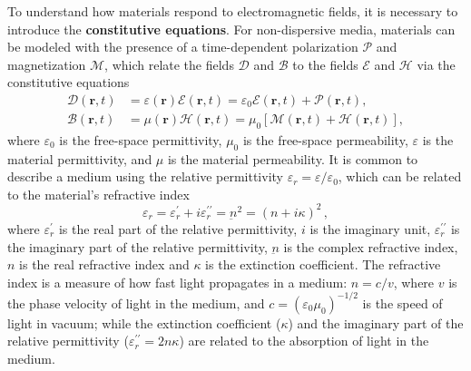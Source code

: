 To understand how materials respond to electromagnetic fields, it is necessary to introduce the \textbf{constitutive equations}.
 For non-dispersive media, materials can be
modeled
with the presence of a time-dependent polarization $\bm{\mathcal{P}}$ and
magnetization $\bm{\mathcal{M}}$,
which relate the fields $\bm{\mathcal{D}}$ and $\bm{\mathcal{B}}$ to the fields
$\bm{\mathcal{E}}$ and
$\bm{\mathcal{H}}$ via the constitutive equations~\cite{novotny}
\begin{align}
    \bm{\mathcal{D}}(\mathbf{r}, t) & = \varepsilon(\mathbf{r}) \bm{\mathcal{E}}(\mathbf{r}, t) =
    \varepsilon_0 \bm{\mathcal{E}}(\mathbf{r}, t) + \bm{\mathcal{P}}(\mathbf{r}, t),
    \label{eq:D}                                                                \\
    \bm{\mathcal{B}}(\mathbf{r}, t) & =  \mu(\mathbf{r}) \bm{\mathcal{H}}(\mathbf{r},
    t) = \mu_0 \left[ \bm{\mathcal{M}}(\mathbf{r},
    t) + \bm{\mathcal{H}}(\mathbf{r}, t)\right] \label{eq:H},
\end{align}
where $\varepsilon_0$ is the free-space permittivity, $\mu_0$ is the free-space
permeability, $\varepsilon$ is the material permittivity, and 
$\mu$ is the material permeability. It is common to describe a medium
using the relative permittivity $\varepsilon_r=\varepsilon/\varepsilon_0$, which can be related to the material's refractive index~\cite{wooten}
\begin{equation}\label{eq:perm}
    \varepsilon_r = \varepsilon_r^\prime +
i \varepsilon_r^{\prime\prime} = \underbar{n}^2 = (n+ i\kappa)^2\,,
\end{equation}
where $\varepsilon_r^\prime$ is the real part of the relative permittivity, $i$ is the imaginary unit, $\varepsilon_r^{\prime\prime}$ is the imaginary part of the relative permittivity, $\underbar{n}$ is the complex refractive index, 
$n$ is the real refractive index and $\kappa$ is the extinction coefficient. 
The refractive index is a measure of how fast light propagates in a medium: $n=c/v$, where $v$ is the phase velocity of light in the medium, and 
$c=(\varepsilon_0 \mu_0)^{-1/2}$ is the speed of light in vacuum; while the extinction
coefficient ($\kappa$) and the imaginary part of the relative permittivity ($\varepsilon_r^{\prime\prime}=2n\kappa$) are related to the absorption of light in the medium.


